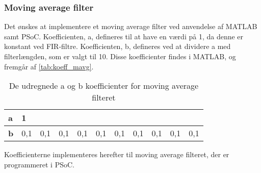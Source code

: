 \subsubsection{Moving average filter}
Det ønskes at implementere et moving average filter ved anvendelse af MATLAB samt PSoC. Koefficienten, a, defineres til at have en værdi på 1, da denne er konstant ved FIR-filtre. Koefficienten, b, defineres ved at dividere a med filterlængden, som er valgt til 10. Disse koefficienter findes i MATLAB, og fremgår af \autoref{tab:koeff_mavg}. 

\begin{table}[H]
\centering
\begin{tabular}{|l|l|l|l|l|l|l|l|l|l|l|}
\hline
\textbf{a} & 1   &     &     &     &     &     &     &     &     &     \\ \hline
\textbf{b} & 0,1 & 0,1 & 0,1 & 0,1 & 0,1 & 0,1 & 0,1 & 0,1 & 0,1 & 0,1 \\ \hline
\end{tabular}
\caption{De udregnede a og b koefficienter for moving average filteret}
\label{tab:koeff_mavg}
\end{table}

\noindent
Koefficienterne implementeres herefter til moving average filteret, der er programmeret i PSoC. 